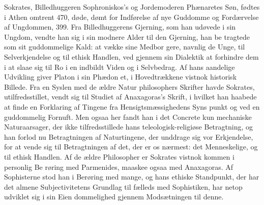 \documentclass[12pt,a4paper]{book}
\begin{document}
Sokrates, Billedhuggeren Sophroniskos's og Jordemoderen
Phænaretes Søn, fødtes i Athen omtrent 470, døde, dømt for
Indførelse af nye Guddomme og Fordærvelse af Ungdommen, 399.
Fra Billedhuggerens Gjerning, som han udøvede i sin Ungdom,
vendte han sig i sin modnere Alder til den Gjerning, han be\-%
tragtede som sit guddommelige Kald: at vække sine Medbor\-%
gere, navnlig de Unge, til Selverkjendelse og til ethisk Handlen,
ved gjennem sin Dialektik at forhindre dem i at slaae sig til
Ro i en indbildt Viden og i Selvbedrag. Af hans aandelige
Udvikling giver Platon i sin Phædon et, i Hovedtrækkene
vistnok historisk Billede. Fra en Syslen med de ældre Natur\-%
philosophers Skrifter havde Sokrates, utilfredsstillet, vendt sig
til Studiet af Anaxagoras's Skrift, i hvilket han haabede at
finde en Forklaring af Tingene fra Hensigtsmæssighedens Syns\-%
punkt og ved en guddommelig Fornuft. Men ogsaa her fandt
han i det Concrete kun mechaniske Naturaarsager, der ikke
tilfredsstillede hans teleologisk-religiøse Betragtning, og han
forlod nu Betragtningen af Naturtingene, der unddrage sig vor
Erkjendelse, for at vende sig til Betragtningen af det, der er
os nærmest: det Menneskelige, og til ethisk Handlen. Af de
ældre Philosopher er Sokrates vistnok kommen i personlig Be\-%
røring med Parmenides, maaskee ogsaa med Anaxagoras. Af
Sophisterne stod han i Berøring med mange, og hans ethiske
Standpunkt, der har det almene Subjectivitetens Grundlag til\-%
fælleds med Sophistiken, har netop udviklet sig i sin Eien\-%
dommelighed gjennem Modsætningen til denne.
\end{document}
